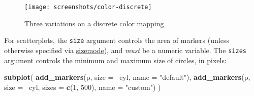 \documentclass[12pt,]{isuthesis}
\newenvironment{Shaded}{\begin{snugshade}}{\end{snugshade}}
\newcommand{\KeywordTok}[1]{\textcolor[rgb]{0.13,0.29,0.53}{\textbf{{#1}}}}
\newcommand{\DataTypeTok}[1]{\textcolor[rgb]{0.13,0.29,0.53}{{#1}}}
\newcommand{\DecValTok}[1]{\textcolor[rgb]{0.00,0.00,0.81}{{#1}}}
\newcommand{\StringTok}[1]{\textcolor[rgb]{0.31,0.60,0.02}{{#1}}}
\newcommand{\NormalTok}[1]{{#1}}
\begin{document}
\begin{Shaded}
\end{Shaded}

\begin{figure}
\centering
\texttt{[image: screenshots/color-discrete]}
\caption{\label{fig:color-discrete}Three variations on a discrete color
mapping}
\end{figure}

For scatterplots, the \texttt{size} argument controls the area of
markers (unless otherwise specified via
\href{https://plot.ly/r/reference/\#scatter-marker-sizemode}{sizemode}),
and \emph{must} be a numeric variable. The \texttt{sizes} argument
controls the minimum and maximum size of circles, in pixels:

\begin{Shaded}
\begin{Highlighting}[]
\KeywordTok{subplot}\NormalTok{(}
  \KeywordTok{add_markers}\NormalTok{(p, }\DataTypeTok{size =} \NormalTok{~cyl, }\DataTypeTok{name =} \StringTok{"default"}\NormalTok{),}
  \KeywordTok{add_markers}\NormalTok{(p, }\DataTypeTok{size =} \NormalTok{~cyl, }\DataTypeTok{sizes =} \KeywordTok{c}\NormalTok{(}\DecValTok{1}\NormalTok{, }\DecValTok{500}\NormalTok{), }\DataTypeTok{name =} \StringTok{"custom"}\NormalTok{)}
\NormalTok{)}
\end{Highlighting}
\end{Shaded}
\end{document}
